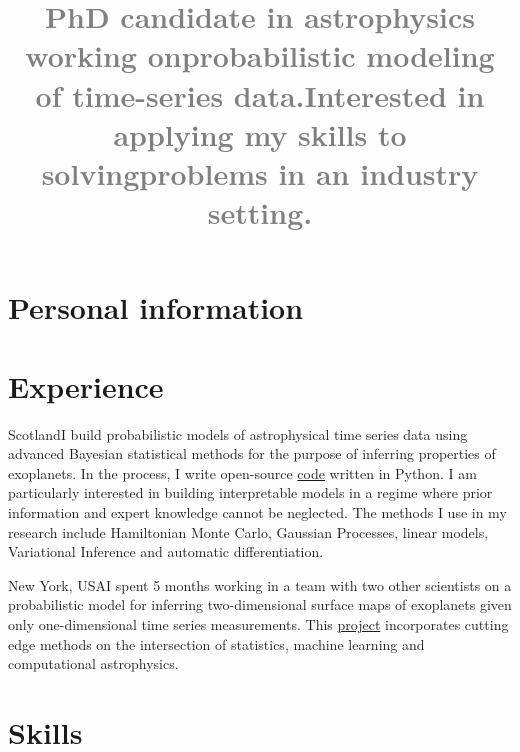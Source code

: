 \documentclass[11pt,a4paper,roman, colorlinks,linkcolor=true]{moderncv}
\title{\textcolor{gray}{ \normalsize PhD candidate in astrophysics 
working on\newline probabilistic modeling of time-series data.\newline Interested 
in applying my skills to solving\newline problems in an industry setting.}}
\begin{document}
\renewcommand*{\titlefont}{\fontsize{14}{18}\mdseries\upshape}
\makecvtitle
\section{Personal information}

\hypersetup{urlcolor=links}
\section{Experience}
{Scotland}{}{I build probabilistic models of astrophysical time series data 
using advanced Bayesian statistical methods for the purpose of inferring properties of exoplanets.
In the process, I write open-source \href{https://caustic.readthedocs.io/en/latest/}{code} written in \textsf{Python}.
I am particularly interested in building interpretable models in a regime where prior information and expert knowledge cannot be neglected.
The methods I use in my research include Hamiltonian Monte Carlo, Gaussian Processes, linear models, Variational Inference and automatic differentiation.}

{New York, USA}{}{I spent 5 months working in a team with two other scientists on a probabilistic model for inferring two-dimensional surface maps of exoplanets given only one-dimensional time series measurements.
This \href{https://github.com/fbartolic/volcano/blob/master-pdf/paper/paper.pdf}{project} incorporates cutting edge methods on the intersection of statistics, machine learning and computational astrophysics.}

\section{Skills}
\end{document}
